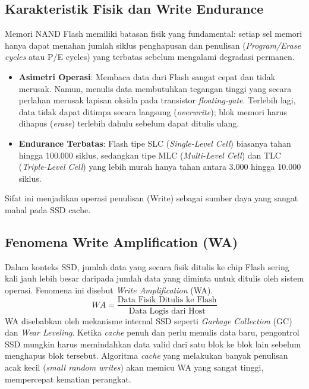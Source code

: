 \subsection{Karakteristik Fisik dan Write Endurance}
Memori NAND Flash memiliki batasan fisik yang fundamental: setiap sel
memori hanya dapat menahan jumlah siklus penghapusan dan penulisan
(\textit{Program/Erase cycles} atau P/E cycles) yang terbatas sebelum
mengalami degradasi permanen.
\begin{itemize}
  \item \textbf{Asimetri Operasi}: Membaca data dari Flash sangat cepat
    dan tidak merusak. Namun, menulis data membutuhkan tegangan tinggi
    yang secara perlahan merusak lapisan oksida pada transistor
    \textit{floating-gate}.
    Terlebih lagi, data tidak dapat ditimpa secara langsung
    (\textit{overwrite});
    blok memori harus dihapus (\textit{erase}) terlebih dahulu sebelum
    dapat ditulis ulang.
  \item \textbf{Endurance Terbatas}: Flash tipe SLC (\textit{Single-Level Cell})
    biasanya tahan hingga 100.000 siklus, sedangkan tipe MLC
    (\textit{Multi-Level Cell})
    dan TLC (\textit{Triple-Level Cell}) yang lebih murah hanya tahan
    antara 3.000 hingga 10.000 siklus.
\end{itemize}
Sifat ini menjadikan operasi penulisan (Write) sebagai sumber daya
yang sangat mahal pada SSD cache.

\subsection{Fenomena Write Amplification (WA)}
Dalam konteks SSD, jumlah data yang secara fisik ditulis ke chip Flash
sering kali jauh lebih besar daripada jumlah data yang diminta untuk
ditulis oleh sistem operasi. Fenomena ini disebut \textit{Write
Amplification} (WA).
\[ WA = \frac{\text{Data Fisik Ditulis ke Flash}}{\text{Data Logis
dari Host}} \]
WA disebabkan oleh mekanisme internal SSD seperti \textit{Garbage Collection}
(GC) dan \textit{Wear Leveling}. Ketika \textit{cache} penuh dan perlu
menulis data baru, pengontrol SSD mungkin harus memindahkan data valid
dari satu blok ke blok lain sebelum menghapus blok tersebut.
Algoritma \textit{cache} yang melakukan banyak penulisan acak kecil
(\textit{small random writes}) akan memicu WA yang sangat tinggi,
mempercepat kematian perangkat.

